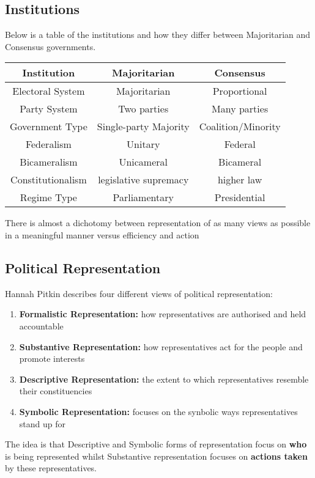 \documentclass[12pt, letterpaper]{article}
\begin{document}
\subsection{Institutions}
Below is a table of the institutions and how they differ between Majoritarian and Consensus governments.
\begin{center}
	\begin{tabular}{c|cc}
	Institution & Majoritarian & Consensus\\
	\hline
	Electoral System & Majoritarian & Proportional\\
	Party System & Two parties & Many parties\\
	Government Type & Single-party Majority & Coalition/Minority\\
	Federalism & Unitary & Federal\\
	Bicameralism & Unicameral & Bicameral\\
	Constitutionalism & legislative supremacy & higher law\\
	Regime Type & Parliamentary & Presidential\\
	\hline
	\end{tabular}
\end{center}
There is almost a dichotomy between representation of as many views as possible in a meaningful manner versus efficiency and action

\subsection{Political Representation}
Hannah Pitkin describes four different views of political representation:
\begin{enumerate}
	\item \textbf{Formalistic Representation:} how representatives are authorised and held accountable
	\item \textbf{Substantive Representation:} how representatives act for the people and promote interests
	\item \textbf{Descriptive Representation:} the extent to which representatives resemble their constituencies
	\item \textbf{Symbolic Representation:} focuses on the synbolic ways representatives stand up for
\end{enumerate}
The idea is that Descriptive and Symbolic forms of representation focus on \textbf{who} is being represented whilst Substantive representation focuses on \textbf{actions taken} by these representatives.
\end{document}
